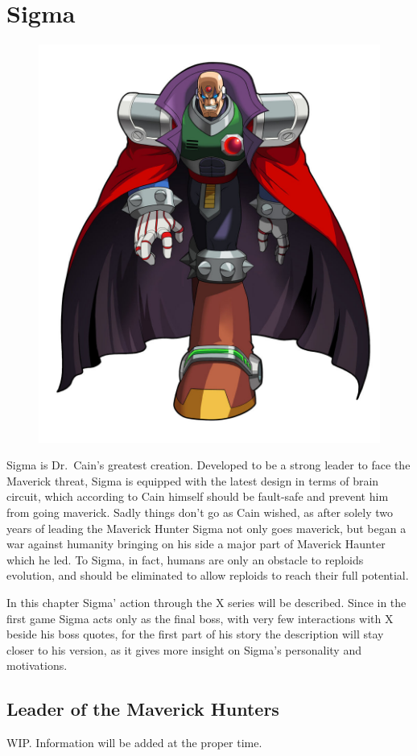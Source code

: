 \chapter{Sigma}\label{char:Sigma}
\begin{figure}[h]
	\centering
	\includegraphics[width=0.4\linewidth]{figures/X1/Sigma_stages/MHXSigma.jpg}
\end{figure}
Sigma is Dr.~Cain's greatest creation. Developed to be a strong leader to face the Maverick threat, Sigma is equipped with the latest design in terms of brain circuit, which according to Cain himself should be fault-safe and prevent him from going maverick. Sadly things don't go as Cain wished, as after solely two years of leading the Maverick Hunter Sigma not only goes maverick, but began a war against humanity bringing on his side a major part of Maverick Haunter which he led. To Sigma, in fact, humans are only an obstacle to reploids evolution, and should be eliminated to allow reploids to reach their full potential. 

In this chapter Sigma' action through the X series will be described. Since in the first game Sigma acts only as the final boss, with very few interactions with X beside his boss quotes, for the first part of his story the description will stay closer to his \mhx version, as it gives more insight on Sigma's personality and motivations.

\section{Leader of the Maverick Hunters}
WIP. Information will be added at the proper time.

